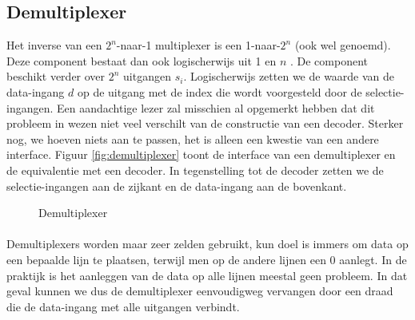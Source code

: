 \subsection{Demultiplexer}
\label{ss:demultiplexer}
Het inverse van een $2^n$-naar-1 multiplexer is een 1-naar-$2^n$  (ook wel  genoemd). Deze component bestaat dan ook logischerwijs uit 1  en $n$ . De component beschikt verder over $2^n$ uitgangen $s_i$. Logischerwijs zetten we de waarde van de data-ingang $d$ op de uitgang met de index die wordt voorgesteld door de selectie-ingangen. Een aandachtige lezer zal misschien al opgemerkt hebben dat dit probleem in wezen niet veel verschilt van de constructie van een decoder. Sterker nog, we hoeven niets aan te passen, het is alleen een kwestie van een andere interface. Figuur \ref{fig:demultiplexer} toont de interface van een demultiplexer en de equivalentie met een decoder. In tegenstelling tot de decoder zetten we de selectie-ingangen aan de zijkant en de data-ingang aan de bovenkant.
\begin{figure}[hbt]
\centering
{}
\caption{Demultiplexer}
\end{figure}
\paragraph{}
Demultiplexers worden maar zeer zelden gebruikt, kun doel is immers om data op een bepaalde lijn te plaatsen, terwijl men op de andere lijnen een 0 aanlegt. In de praktijk is het aanleggen van de data op alle lijnen meestal geen probleem. In dat geval kunnen we dus de demultiplexer eenvoudigweg vervangen door een draad die de data-ingang met alle uitgangen verbindt.
